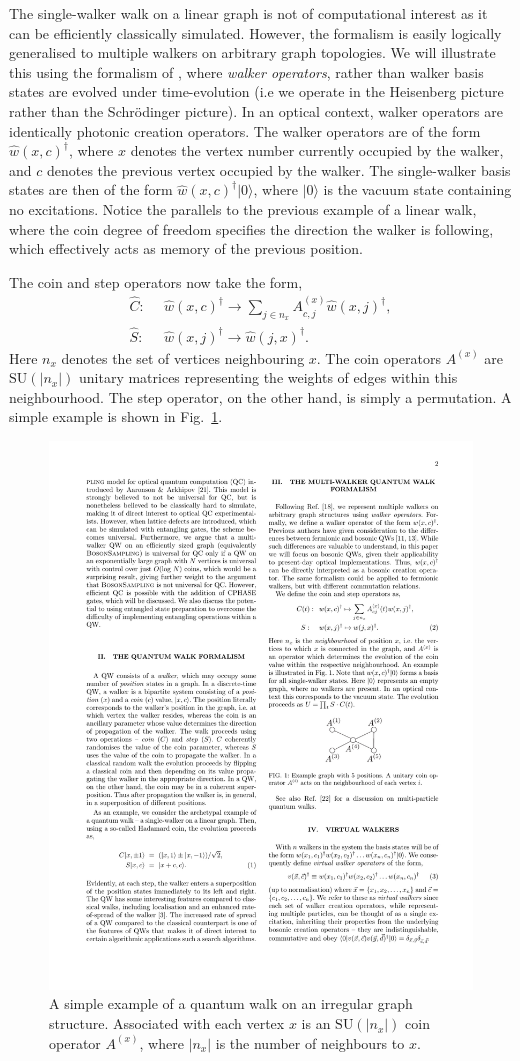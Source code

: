 \documentclass[aps, rmp, twocolumn, amsmath, amssymb, nofootinbib, superscriptaddress, longbibliography, floatfix, table-of-contents, eqsecnum]{revtex4-1}
\newcommand{\ket}[1]{|#1\rangle}
\begin{document}
The single-walker walk on a linear graph is not of computational interest as it can be efficiently classically simulated. However, the formalism is easily logically generalised to multiple walkers on arbitrary graph topologies. We will illustrate this using the formalism of \cite{bib:RohdeMultiWalk11}, where \textit{walker operators}, rather than walker basis states are evolved under time-evolution (i.e we operate in the Heisenberg picture rather than the Schr{\" o}dinger picture). In an optical context, walker operators are identically photonic creation operators. The walker operators are of the form $\hat{w}(x,c)^\dag$, where $x$ denotes the vertex number currently occupied by the walker, and $c$ denotes the previous vertex occupied by the walker. The single-walker basis states are then of the form $\hat{w}(x,c)^\dag\ket{0}$, where $\ket{0}$ is the vacuum state containing no excitations. Notice the parallels to the previous example of a linear walk, where the coin degree of freedom specifies the direction the walker is following, which effectively acts as memory of the previous position.

The coin and step operators now take the form,
\begin{align}
\hat{C}: \,\,\, &\hat{w}(x,c)^\dag \to \sum_{j\in n_x}A_{c,j}^{(x)} \hat{w}(x,j)^\dag, \nonumber \\
\hat{S}: \,\,\, &\hat{w}(x,j)^\dag \to \hat{w}(j,x)^\dag.
\end{align}
Here $n_x$ denotes the set of vertices neighbouring $x$. The coin operators $A^{(x)}$ are \mbox{$\text{SU}(|n_x|)$} unitary matrices representing the weights of edges within this neighbourhood. The step operator, on the other hand, is simply a permutation. A simple example is shown in Fig.~\ref{fig:QW_arbitrary_graph}.

\begin{figure}[!htb]
\includegraphics[width=0.4\columnwidth]{QW_arbitrary_graph}
\caption{A simple example of a quantum walk on an irregular graph structure. Associated with each vertex $x$ is an $\text{SU}(|n_x|)$ coin operator $A^{(x)}$, where $|n_x|$ is the number of neighbours to $x$.} \label{fig:QW_arbitrary_graph}
\end{figure}
\end{document}
